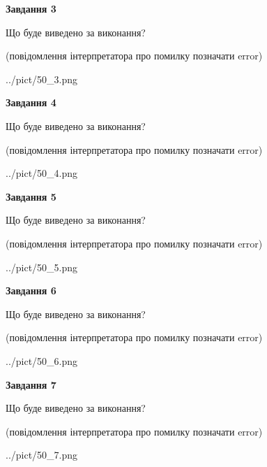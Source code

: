 \documentclass[12pt, ukrainian]{article}
\begin{document}
{\begin {large}
{\begin {center}\textbf{Завдання 3}\end {center}}\par
Що буде виведено за виконання?\par
 (повідомлення інтерпретатора про помилку позначати error)\par
\begin{center}
	{../pict/50_3.png}
\end{center}
\newpage

{\begin {center}\textbf{Завдання 4}\end {center}}\par
Що буде виведено за виконання?\par
 (повідомлення інтерпретатора про помилку позначати error)\par
\begin{center}
	{../pict/50_4.png}
\end{center}
\newpage

{\begin {center}\textbf{Завдання 5}\end {center}}\par
Що буде виведено за виконання?\par
 (повідомлення інтерпретатора про помилку позначати error)\par
\begin{center}
	{../pict/50_5.png}
\end{center}
\newpage

{\begin {center}\textbf{Завдання 6}\end {center}}\par
Що буде виведено за виконання?\par
 (повідомлення інтерпретатора про помилку позначати error)\par
\begin{center}
	{../pict/50_6.png}
\end{center}
\newpage

{\begin {center}\textbf{Завдання 7}\end {center}}\par
Що буде виведено за виконання?\par
 (повідомлення інтерпретатора про помилку позначати error)\par
\begin{center}
	{../pict/50_7.png}
\end{center}
\newpage


\end{large}}
\end{document}
